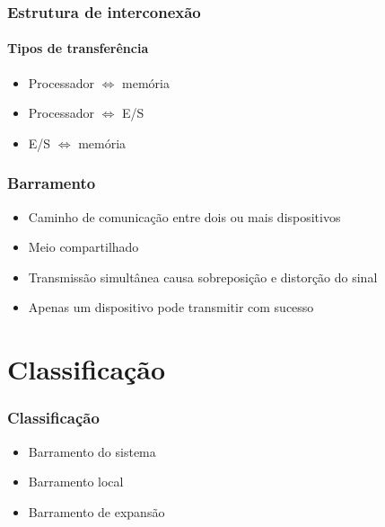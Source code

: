 \documentclass[aspectratio=169,
				xcolor=table]{beamer}
\begin{document}
	\begin{frame}
		\frametitle{Estrutura de interconexão}
		\framesubtitle{Tipos de transferência}
		\begin{itemize}
			\item Processador $\Leftrightarrow$  memória
			\vspace{1em}
			\item Processador $\Leftrightarrow$  E/S
			\vspace{1em}
			\item E/S $\Leftrightarrow$ memória
		\end{itemize}
	\end{frame}
	
	\begin{frame}
		\frametitle{Barramento}
		\begin{itemize}
			\item Caminho de comunicação entre dois ou mais dispositivos
			\vspace{1em}
			\item Meio \alert{compartilhado}
			\vspace{1em}
			\item Transmissão simultânea causa sobreposição e distorção do sinal
			\vspace{1em}
			\item Apenas um dispositivo pode transmitir com sucesso
		\end{itemize}
	\end{frame}

	
	\section{Classificação}
	
	\begin{frame}
		\frametitle{Classificação}
		\begin{itemize}
			\item Barramento do sistema
			\vspace{1em}
			\item Barramento local
			\vspace{1em}
			\item Barramento de expansão
		\end{itemize}
	\end{frame}
	
\end{document}
